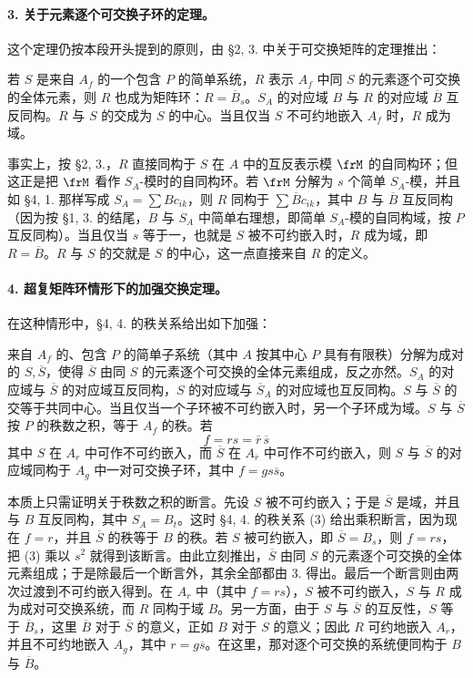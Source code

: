 \paragraph{3. 关于元素逐个可交换子环的定理。}
这个定理仍按本段开头提到的原则，由 §2, 3. 中关于可交换矩阵的定理推出：

若 \(S\) 是来自 \(A_f\) 的一个包含 \(P\) 的简单系统，\(R\) 表示 \(A_f\) 中同 \(S\) 的元素逐个可交换的全体元素，则 \(R\) 也成为矩阵环：\(R=\overline B_s\)。\(S_A\) 的对应域 \(B\) 与 \(R\) 的对应域 \(\overline B\) 互反同构。\(R\) 与 \(S\) 的交成为 \(S\) 的中心。当且仅当 \(S\) 不可约地嵌入 \(A_f\) 时，\(R\) 成为域。

事实上，按 §2, 3.，\(R\) 直接同构于 \(S\) 在 \(A\) 中的互反表示模 \(\frM\) 的自同构环；但这正是把 \(\frM\) 看作 \(S_A\)-模时的自同构环。若 \(\frM\) 分解为 \(s\) 个简单 \(S_A\)-模，并且如 §4, 1. 那样写成 \(S_A=\sum Bc_{ik}\)，则 \(R\) 同构于 \(\sum \overline Bc_{ik}\)，其中 \(B\) 与 \(\overline B\) 互反同构（因为按 §1, 3. 的结尾，\(B\) 与 \(S_A\) 中简单右理想，即简单 \(S_A\)-模的自同构域，按 \(P\) 互反同构）。当且仅当 \(s\) 等于一，也就是 \(S\) 被不可约嵌入时，\(R\) 成为域，即 \(R=\overline B\)。\(R\) 与 \(S\) 的交就是 \(S\) 的中心，这一点直接来自 \(R\) 的定义。

\paragraph{4. 超复矩阵环情形下的加强交换定理。}
在这种情形中，§4, 4. 的秩关系给出如下加强：

来自 \(A_f\) 的、包含 \(P\) 的简单子系统（其中 \(A\) 按其中心 \(P\) 具有有限秩）分解为成对的 \(S,\overline S\)，使得 \(\overline S\) 由同 \(S\) 的元素逐个可交换的全体元素组成，反之亦然。\(S_A\) 的对应域与 \(\overline S\) 的对应域互反同构，\(S\) 的对应域与 \(\overline S_A\) 的对应域也互反同构。\(S\) 与 \(\overline S\) 的交等于共同中心。当且仅当一个子环被不可约嵌入时，另一个子环成为域。\(S\) 与 \(\overline S\) 按 \(P\) 的秩数之积，等于 \(A_f\) 的秩。若
\[
        f=rs=\overline r\,\overline s
\]
其中 \(S\) 在 \(A_r\) 中可作不可约嵌入，而 \(\overline S\) 在 \(A_{\overline r}\) 中可作不可约嵌入，则 \(S\) 与 \(\overline S\) 的对应域同构于 \(A_g\) 中一对可交换子环，其中 \(f=g s\overline s\)。

本质上只需证明关于秩数之积的断言。先设 \(S\) 被不可约嵌入；于是 \(\overline S\) 是域，并且与 \(B\) 互反同构，其中 \(S_A=B_t\)。这时 §4, 4. 的秩关系 (3) 给出乘积断言，因为现在 \(f=r\)，并且 \(\overline S\) 的秩等于 \(B\) 的秩。若 \(S\) 被可约嵌入，即 \(\overline S=B_s\)，则 \(f=rs\)，把 (3) 乘以 \(s^2\) 就得到该断言。由此立刻推出，\(\overline S\) 由同 \(S\) 的元素逐个可交换的全体元素组成；于是除最后一个断言外，其余全部都由 3. 得出。最后一个断言则由两次过渡到不可约嵌入得到。在 \(A_r\) 中（其中 \(f=rs\)），\(S\) 被不可约嵌入，\(S\) 与 \(R\) 成为成对可交换系统，而 \(R\) 同构于域 \(B\)。另一方面，由于 \(S\) 与 \(\overline S\) 的互反性，\(S\) 等于 \(\overline B_s\)，这里 \(\overline B\) 对于 \(\overline S\) 的意义，正如 \(B\) 对于 \(S\) 的意义；因此 \(R\) 可约地嵌入 \(A_r\)，并且不可约地嵌入 \(A_g\)，其中 \(r=g\overline s\)。在这里，那对逐个可交换的系统便同构于 \(B\) 与 \(\overline B\)。

